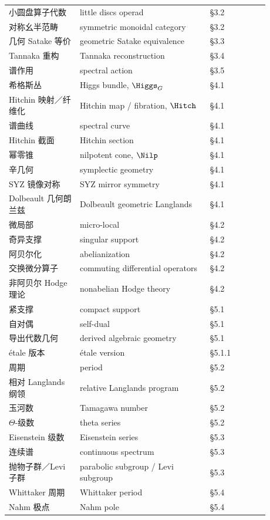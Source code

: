 \begin{center}
\begin{longtable}{@{}>{\raggedright\arraybackslash}p{0.24\linewidth}>{\raggedright\arraybackslash}p{0.44\linewidth}>{\raggedright\arraybackslash}p{0.20\linewidth}@{}}
小圆盘算子代数 & little discs operad & §3.2 \\
对称幺半范畴 & symmetric monoidal category & §3.2 \\
几何 Satake 等价 & geometric Satake equivalence & §3.3 \\
Tannaka 重构 & Tannaka reconstruction & §3.4 \\
谱作用 & spectral action & §3.5 \\
希格斯丛 & Higgs bundle, $\Higgs_{G}$ & §4.1 \\
Hitchin 映射／纤维化 & Hitchin map / fibration, $\Hitch$ & §4.1 \\
谱曲线 & spectral curve & §4.1 \\
Hitchin 截面 & Hitchin section & §4.1 \\
幂零锥 & nilpotent cone, $\Nilp$ & §4.1 \\
辛几何 & symplectic geometry & §4.1 \\
SYZ 镜像对称 & SYZ mirror symmetry & §4.1 \\
Dolbeault 几何朗兰兹 & Dolbeault geometric Langlands & §4.1 \\
微局部 & micro-local & §4.2 \\
奇异支撑 & singular support & §4.2 \\
阿贝尔化 & abelianization & §4.2 \\
交换微分算子 & commuting differential operators & §4.2 \\
非阿贝尔 Hodge 理论 & nonabelian Hodge theory & §4.2 \\
紧支撑 & compact support & §5.1 \\
自对偶 & self-dual & §5.1 \\
导出代数几何 & derived algebraic geometry & §5.1 \\
étale 版本 & étale version & §5.1.1 \\
周期 & period & §5.2 \\
相对 Langlands 纲领 & relative Langlands program & §5.2 \\
玉河数 & Tamagawa number & §5.2 \\
$\Theta$-级数 & theta series & §5.2 \\
Eisenstein 级数 & Eisenstein series & §5.3 \\
连续谱 & continuous spectrum & §5.3 \\
抛物子群／Levi 子群 & parabolic subgroup / Levi subgroup & §5.3 \\
Whittaker 周期 & Whittaker period & §5.4 \\
Nahm 极点 & Nahm pole & §5.4 \\

\end{longtable}
\end{center}
